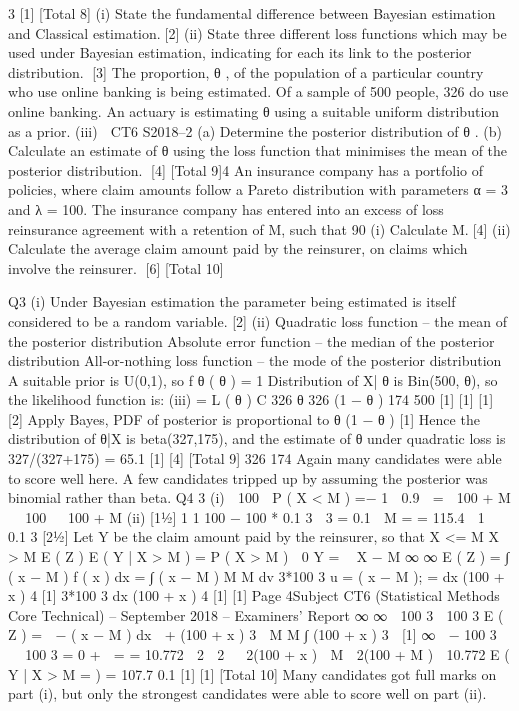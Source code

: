 3
[1]
[Total 8]
(i) State the fundamental difference between Bayesian estimation and Classical
estimation.[2]
(ii) State three different loss functions which may be used under Bayesian
estimation, indicating for each its link to the posterior distribution.
[3]
The proportion, θ , of the population of a particular country who use online banking is
being estimated. Of a sample of 500 people, 326 do use online banking.
An actuary is estimating θ using a suitable uniform distribution as a prior.
(iii)

CT6 S2018–2
(a) Determine the posterior distribution of θ .
(b) Calculate an estimate of θ using the loss function that minimises the
mean of the posterior distribution.
[4]
[Total 9]4
An insurance company has a portfolio of policies, where claim amounts follow a
Pareto distribution with parameters α = 3 and λ = 100. The insurance company has
entered into an excess of loss reinsurance agreement with a retention of M, such that
90%
(i) Calculate M.[4]
(ii) Calculate the average claim amount paid by the reinsurer, on claims which
involve the reinsurer.
[6]
[Total 10]

Q3
(i) Under Bayesian estimation the parameter being estimated is itself considered
to be a random variable.
[2]
(ii) Quadratic loss function – the mean of the posterior distribution
Absolute error function – the median of the posterior distribution
All-or-nothing loss function – the mode of the posterior distribution
A suitable prior is U(0,1), so f θ ( θ ) = 1
Distribution of X| θ is Bin(500, θ), so the likelihood function is:
(iii)
=
L ( θ )
C 326 θ 326 (1 − θ ) 174
500
[1]
[1]
[1]
[2]
Apply Bayes, PDF of posterior is proportional to θ (1 − θ )
[1]
Hence the distribution of θ|X is beta(327,175), and the estimate of θ under
quadratic loss is 327/(327+175) = 65.1%
[1]
[4]
[Total 9]
326
174
Again many candidates were able to score well here. A few candidates tripped up by
assuming the posterior was binomial rather than beta.
Q4
3
(i)
 100 
P ( X < M ) =−
1 
0.9
 =
 100 + M 
 100

 100 + M
(ii)
[11⁄2]
1
1
100 − 100 * 0.1 3

3
=
0.1
⇒
M
=
= 115.4

1

0.1 3
[21⁄2]
Let Y be the claim amount paid by the reinsurer, so that
X <= M
X > M
E ( Z )
E ( Y | X > M ) =
P ( X > M )
 0
Y =
 X − M
∞
∞
E ( Z ) =
∫ ( x − M ) f ( x ) dx =
∫ ( x − M )
M
M
dv
3*100 3
u =
( x − M ); =
dx (100 + x ) 4
[1]
3*100 3
dx
(100 + x ) 4
[1]
[1]
Page 4Subject CT6 (Statistical Methods Core Technical) – September 2018 – Examiners’ Report
∞
∞

100 3 
100 3
E ( Z ) =  − ( x − M )
dx
 +
(100 + x ) 3  M M ∫ (100 + x ) 3

[1]
∞
 − 100 3 


100 3
=
0 + 
=
=
10.772

2 
2 
 2(100 + x )  M  2(100 + M ) 
10.772
E ( Y | X > M =
)
= 107.7
0.1
[1]
[1]
[Total 10]
Many candidates got full marks on part (i), but only the strongest candidates were able to
score well on part (ii).
